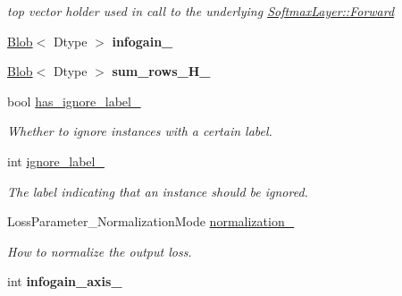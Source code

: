 \begin{DoxyCompactItemize}
\begin{DoxyCompactList}\small\item\em top vector holder used in call to the underlying \hyperlink{classcaffe_1_1Layer_aa5fc9ddb31b58958653372bdaaccde94}{Softmax\+Layer\+::\+Forward} \end{DoxyCompactList}\item 
\hyperlink{classcaffe_1_1Blob}{Blob}$<$ Dtype $>$ {\bfseries infogain\+\_\+}\hypertarget{classcaffe_1_1InfogainLossLayer_a2d9ffe8c64b096042cc75fced30dcaca}{}\label{classcaffe_1_1InfogainLossLayer_a2d9ffe8c64b096042cc75fced30dcaca}

\item 
\hyperlink{classcaffe_1_1Blob}{Blob}$<$ Dtype $>$ {\bfseries sum\+\_\+rows\+\_\+\+H\+\_\+}\hypertarget{classcaffe_1_1InfogainLossLayer_a4f3a277e92ec66b9ad09d3a0fddcd595}{}\label{classcaffe_1_1InfogainLossLayer_a4f3a277e92ec66b9ad09d3a0fddcd595}

\item 
bool \hyperlink{classcaffe_1_1InfogainLossLayer_a421720fc0f85daf8b6b7808719b1f9e8}{has\+\_\+ignore\+\_\+label\+\_\+}\hypertarget{classcaffe_1_1InfogainLossLayer_a421720fc0f85daf8b6b7808719b1f9e8}{}\label{classcaffe_1_1InfogainLossLayer_a421720fc0f85daf8b6b7808719b1f9e8}

\begin{DoxyCompactList}\small\item\em Whether to ignore instances with a certain label. \end{DoxyCompactList}\item 
int \hyperlink{classcaffe_1_1InfogainLossLayer_ad3f7c2efdf32f99510186495ba7c5cff}{ignore\+\_\+label\+\_\+}\hypertarget{classcaffe_1_1InfogainLossLayer_ad3f7c2efdf32f99510186495ba7c5cff}{}\label{classcaffe_1_1InfogainLossLayer_ad3f7c2efdf32f99510186495ba7c5cff}

\begin{DoxyCompactList}\small\item\em The label indicating that an instance should be ignored. \end{DoxyCompactList}\item 
Loss\+Parameter\+\_\+\+Normalization\+Mode \hyperlink{classcaffe_1_1InfogainLossLayer_ab7fe88c996d31d67f5e13fc0ffc803c2}{normalization\+\_\+}\hypertarget{classcaffe_1_1InfogainLossLayer_ab7fe88c996d31d67f5e13fc0ffc803c2}{}\label{classcaffe_1_1InfogainLossLayer_ab7fe88c996d31d67f5e13fc0ffc803c2}

\begin{DoxyCompactList}\small\item\em How to normalize the output loss. \end{DoxyCompactList}\item 
int {\bfseries infogain\+\_\+axis\+\_\+}\hypertarget{classcaffe_1_1InfogainLossLayer_a0f94b595bd8be01b31994236af8cecbd}{}\label{classcaffe_1_1InfogainLossLayer_a0f94b595bd8be01b31994236af8cecbd}


\end{DoxyCompactItemize}
